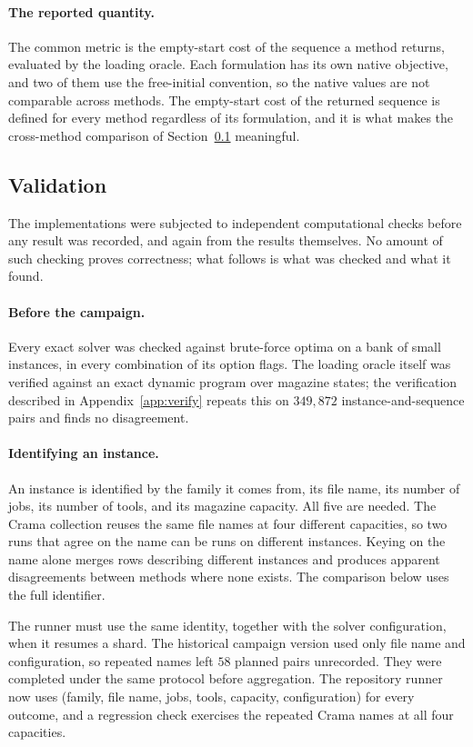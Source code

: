 \paragraph{The reported quantity.}
The common metric is the empty-start cost of the sequence a method returns, evaluated
by the loading oracle. Each formulation has its own native objective, and two of them
use the free-initial convention, so the native values are not comparable across
methods. The empty-start cost of the returned sequence is defined for every method
regardless of its formulation, and it is what makes the cross-method comparison of
Section~\ref{ssec:validation} meaningful.

\subsection{Validation}\label{ssec:validation}

The implementations were subjected to independent computational checks before any
result was recorded, and again from the results themselves. No amount of such checking
proves correctness; what follows is what was checked and what it found.

\paragraph{Before the campaign.}
Every exact solver was checked against brute-force optima on a bank of small instances,
in every combination of its option flags. The loading oracle itself was verified
against an exact dynamic program over magazine states; the verification described in
Appendix~\ref{app:verify} repeats this on $349{,}872$ instance-and-sequence pairs and
finds no disagreement.

\paragraph{Identifying an instance.}
An instance is identified by the family it comes from, its file name, its number of
jobs, its number of tools, and its magazine capacity. All five are needed. The Crama
collection reuses the same file names at four different capacities, so two runs that
agree on the name can be runs on different instances. Keying on the name alone merges
rows describing different instances and produces apparent disagreements between methods
where none exists. The comparison below uses the full identifier.

The runner must use the same identity, together with the solver configuration, when it
resumes a shard. The historical campaign version used only file name and configuration,
so repeated names left $58$ planned pairs unrecorded. They were completed under the same
protocol before aggregation. The repository runner now uses (family, file name, jobs,
tools, capacity, configuration) for every outcome, and a regression check exercises the
repeated Crama names at all four capacities.

